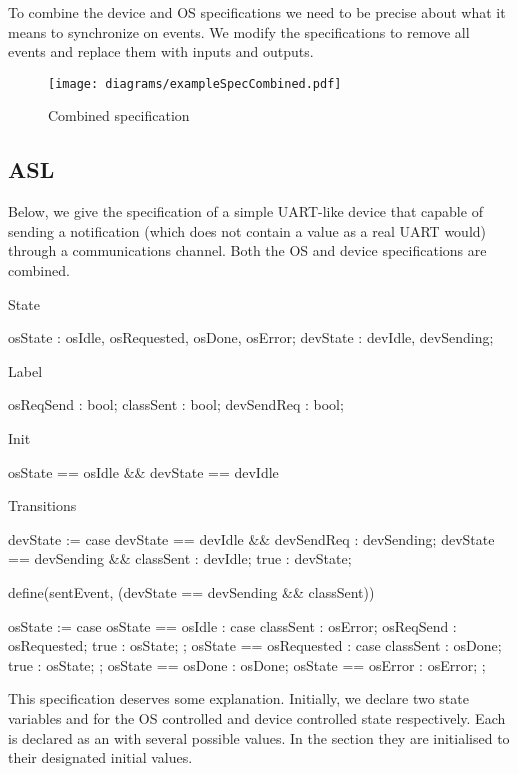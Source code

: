 To combine the device and OS specifications we need to be precise about what it means to synchronize on events. We modify the specifications to remove all events and replace them with inputs and outputs.

\begin{figure}
\centering
\texttt{[image: diagrams/exampleSpecCombined.pdf]}
\caption{Combined specification}
\label{fig:combined_spec}
\end{figure}

\subsection{ASL}

Below, we give the specification of a simple UART-like device that capable of sending a notification (which does not contain a value as a real UART would) through a communications channel. Both the OS and device specifications are combined. 

\begin{asllisting}
State

osState  : {osIdle, osRequested, osDone, osError};
devState : {devIdle, devSending};

Label

osReqSend  : bool;
classSent  : bool;
devSendReq : bool;

Init

osState == osIdle && devState == devIdle

Transitions

devState := case {
    devState == devIdle    && devSendReq : devSending;
    devState == devSending && classSent  : devIdle;
    true                                 : devState;
}

define(sentEvent, (devState == devSending && classSent))
 
osState := case {
    osState == osIdle :
        case {
            classSent : osError;
            osReqSend : osRequested;
            true      : osState;
        };
    osState == osRequested :
        case {
            classSent : osDone;
            true      : osState;
        };
    osState == osDone  : osDone;
    osState == osError : osError;
};
\end{asllisting}

This specification deserves some explanation. Initially, we declare two state variables  and  for the OS controlled and device controlled state respectively. Each is declared as an  with several possible values. In the  section they are initialised to their designated initial values.

